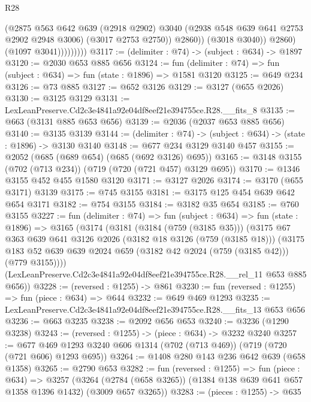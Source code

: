 \begin{lexlean}{R28}
\begin{coremodule}
                            (@2875
                              @563
                              @642
                              @639
                              (@2918 @2902)
                              @3040
                              (@2938 @548 @639 @641 @2753 @2902 @2948 @3006)
                              (@3017 @2753 @2750))
                            @2860))
                        (@3018 @3040))
                      @2860)
                    (@1097 @3041)))))))))
@3117 := (delimiter : @74) -> (subject : @634) -> @1897
@3120 := @2030 @653 @885 @656
@3124 := fun (delimiter : @74) => fun (subject : @634) => fun (state : @1896) => @1581 @3120
@3125 := @649 @234
@3126 := @73 @885
@3127 := @652 @3126
@3129 := @3127 (@655 @2026)
@3130 := @3125 @3129
@3131 := LexLeanPreserve.Cd2c3e4841a92e04df8eef21e394755ce.R28.__fits_8
@3135 := @663 (@3131 @885 @653 @656)
@3139 := @2036 (@2037 @653 @885 @656)
@3140 := @3135 @3139
@3144 := (delimiter : @74) -> (subject : @634) -> (state : @1896) -> @3130 @3140
@3148 := @677 @234 @3129 @3140 @457
@3155 := @2052 (@685 (@689 @654) (@685 (@692 @3126) @695))
@3165 := @3148 @3155 (@702 (@713 @234)) (@719 (@720 (@721 @457) @3129 @695))
@3170 := @1346 @3155 @452 @455 @1580 @3120
@3171 := @3127 @2026
@3174 := @3170 (@655 @3171) @3139
@3175 := @745 @3155
@3181 := @3175 @125 @454 @639 @642 @654 @3171
@3182 := @754 @3155
@3184 := @3182 @35 @654
@3185 := @760 @3155
@3227 := fun (delimiter : @74) =>
  fun (subject : @634) =>
  fun (state : @1896) =>
  @3165
    (@3174
      (@3181
        (@3184 (@759 (@3185 @35)))
        (@3175
          @67
          @363
          @639
          @641
          @3126
          @2026
          (@3182 @18 @3126 (@759 (@3185 @18)))
          (@3175 @183 @52 @639 @639 @2024 @659 (@3182 @42 @2024 (@759 (@3185 @42))) (@779 @3155))))
      (LexLeanPreserve.Cd2c3e4841a92e04df8eef21e394755ce.R28.__rel_11 @653 @885 @656))
@3228 := (reversed : @1255) -> @861
@3230 := fun (reversed : @1255) => fun (piece : @634) => @644
@3232 := @649 @469 @1293
@3235 := LexLeanPreserve.Cd2c3e4841a92e04df8eef21e394755ce.R28.__fits_13 @653 @656
@3236 := @663 @3235
@3238 := @2092 @656 @653
@3240 := @3236 (@1290 @3238)
@3243 := (reversed : @1255) -> (piece : @634) -> @3232 @3240
@3257 := @677 @469 @1293 @3240 @606 @1314 (@702 (@713 @469)) (@719 (@720 (@721 @606) @1293 @695))
@3264 := @1408 @280 @143 @236 @642 @639 (@658 @1358)
@3265 := @2790 @653
@3282 := fun (reversed : @1255) =>
  fun (piece : @634) =>
  @3257
    (@3264 (@2784 (@658 @3265)) (@1384 @138 @639 @641 @657 @1358 @1396 @1432) (@3009 @657 @3265))
@3283 := (pieces : @1255) -> @635

\end{coremodule}
\end{lexlean}
